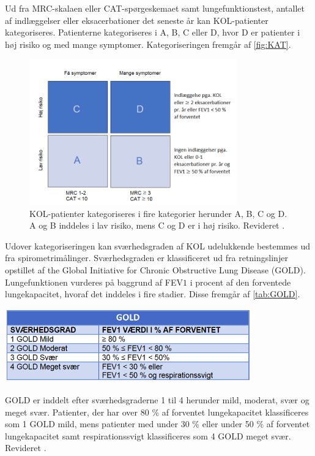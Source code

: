 \noindent
Ud fra MRC-skalaen eller CAT-spørgeskemaet samt lungefunktionstest, antallet af indlæggelser eller eksacerbationer det seneste år kan KOL-patienter kategoriseres. Patienterne kategoriseres i A, B, C eller D, hvor D er patienter i høj risiko og med mange symptomer. Kategoriseringen fremgår af \autoref{fig:KAT}.

\begin{figure} [H]
\centering
\includegraphics[width=0.8\textwidth]{figures/KAT}
\caption{KOL-patienter kategoriseres i fire kategorier herunder A, B, C og D. A og B inddeles i lav risiko, mens C og D er i høj risiko. Revideret \cite{Basisbogen2016}.}
\label{fig:KAT}
\end{figure} 
 
\noindent
Udover kategoriseringen kan sværhedsgraden af KOL udelukkende bestemmes ud fra spirometrimålinger.  Sværhedsgraden er klassificeret ud fra retningslinjer opstillet af the Global Initiative for Chronic Obstructive Lung Disease (GOLD).\cite{dsam2016} Lungefunktionen vurderes på baggrund af FEV$1$ i procent af den forventede lungekapacitet, hvoraf det inddeles i fire stadier. Disse fremgår af \autoref{tab:GOLD}.

\begin{table} [H]
\centering
\includegraphics[width=0.8\textwidth]{figures/GOLD}
\caption{GOLD er inddelt efter sværhedsgraderne  1 til 4 herunder mild, moderat, svær og meget svær. Patienter, der har over 80 \% af forventet lungekapacitet klassificeres som 1 GOLD mild, mens patienter med under 30 \% eller under 50 \% af forventet lungekapacitet samt respirationssvigt klassificeres som 4 GOLD meget svær. Revideret \cite{Basisbogen2016}.}
\label{tab:GOLD}
\end{table} 

